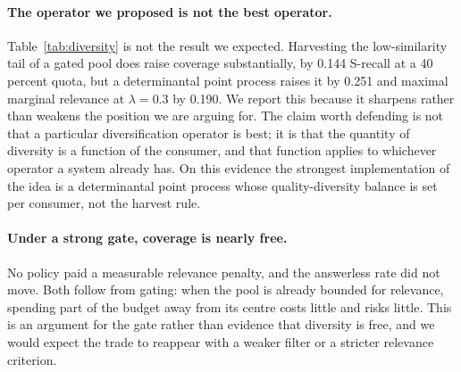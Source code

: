 \paragraph{The operator we proposed is not the best operator.}
Table~\ref{tab:diversity} is not the result we expected. Harvesting the
low-similarity tail of a gated pool does raise coverage substantially, by 0.144
S-recall at a 40 percent quota, but a determinantal point process raises it by
0.251 and maximal marginal relevance at $\lambda=0.3$ by 0.190. We report this
because it sharpens rather than weakens the position we are arguing for. The
claim worth defending is not that a particular diversification operator is best;
it is that the quantity of diversity is a function of the consumer, and that
function applies to whichever operator a system already has. On this evidence the
strongest implementation of the idea is a determinantal point process whose
quality-diversity balance is set per consumer, not the harvest rule.

\paragraph{Under a strong gate, coverage is nearly free.}
No policy paid a measurable relevance penalty, and the answerless rate did not
move. Both follow from gating: when the pool is already bounded for relevance,
spending part of the budget away from its centre costs little and risks little.
This is an argument for the gate rather than evidence that diversity is free, and
we would expect the trade to reappear with a weaker filter or a stricter
relevance criterion.
